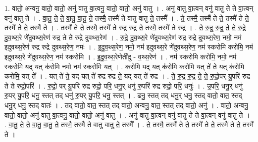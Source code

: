 \documentclass[17pt]{extarticle}
\begin{document}
1. वातो॒ अन्वनु॒ वातो॒ वातो॒ अनु॑ वातु वा॒त्वनु॒ वातो॒ वातो॒ अनु॑ वातु । . अनु॑ वातु वा॒त्वन् वनु॑ वातु ते ते वा॒त्वन् वनु॑ वातु ते । . वा॒तु॒ ते॒ ते॒ वा॒तु॒ वा॒तु॒ ते॒ तस्मै॒ तस्मै॑ ते वातु वातु ते॒ तस्मै᳚ । . ते॒ तस्मै॒ तस्मै॑ ते ते॒ तस्मै॑ ते ते॒ तस्मै॑ ते ते॒ तस्मै॑ ते । . तस्मै॑ ते ते॒ तस्मै॒ तस्मै॑ ते रुद्र रुद्र ते॒ तस्मै॒ तस्मै॑ ते रुद्र । . ते॒ रु॒द्र॒ रु॒द्र॒ ते॒ ते॒ रु॒द्रे॒ दु॒व॒थ्स॒रे णे॑दुवथ्स॒रेण॑ रुद्र ते ते रुद्रे दुवथ्स॒रेण॑ । . रु॒द्रे॒ दु॒व॒थ्स॒रे णे॑दुवथ्स॒रेण॑ रुद्र रुद्रे दुवथ्स॒रेण॒ नमो॒ नम॑ इदुवथ्स॒रेण॑ रुद्र रुद्रे दुवथ्स॒रेण॒ नमः॑ । . इ॒दु॒व॒थ्स॒रेण॒ नमो॒ नम॑ इदुवथ्स॒रे णे॑दुवथ्स॒रेण॒ नम॑ स्करोमि करोमि॒ नम॑ इदुवथ्स॒रे
णे॑दुवथ्स॒रेण॒ नम॑ स्करोमि । . इ॒दु॒व॒थ्स॒रेणेती॑दु - व॒थ्स॒रेण॑ । . नम॑ स्करोमि करोमि॒ नमो॒ नम॑ स्करोमि॒ यद् यत् क॑रोमि॒ नमो॒ नम॑ स्करोमि॒ यत् । . क॒रो॒मि॒ यद् यत् क॑रोमि करोमि॒ यत् ते॑ ते॒ यत् क॑रोमि करोमि॒ यत् ते᳚ । . यत् ते॑ ते॒ यद् यत् ते॑ रुद्र रुद्र ते॒ यद् यत् ते॑ रुद्र । . ते॒ रु॒द्र॒ रु॒द्र॒ ते॒ ते॒ रु॒द्रो॒पर् यु॒परि॑ रुद्र ते ते रुद्रो॒परि॑ । . रु॒द्रो॒ पर् यु॒परि॑ रुद्र रुद्रो॒ परि॒ धनु॒र् धनु॑ रु॒परि॑ रुद्र रुद्रो॒ परि॒ धनुः॑ । . उ॒परि॒ धनु॒र् धनु॑ रु॒पर् यु॒परि॒ धनु॒ स्तत् तद् धनु॑ रु॒पर् यु॒परि॒ धनु॒ स्तत् । . ढनु॒ स्तत् तद् धनु॒र् धनु॒ स्तद् वातो॒ वात॒ स्तद् धनु॒र् धनु॒ स्तद् वातः॑ । . तद् वातो॒ वात॒ स्तत् तद् वातो॒ अन्वनु॒ वात॒ स्तत् तद् वातो॒ अनु॑ । . वातो॒ अन्वनु॒ वातो॒ वातो॒ अनु॑ वातु वा॒त्वनु॒ वातो॒ वातो॒ अनु॑ वातु । . अनु॑ वातु वा॒त्वन् वनु॑ वातु ते ते वा॒त्वन् वनु॑ वातु ते । . वा॒तु॒ ते॒ ते॒ वा॒तु॒ वा॒तु॒ ते॒ तस्मै॒ तस्मै॑ ते वातु वातु ते॒ तस्मै᳚ । . ते॒ तस्मै॒ तस्मै॑ ते ते॒ तस्मै॑ ते ते॒ तस्मै॑ ते ते॒ तस्मै॑ ते । \newline
\end{document}

